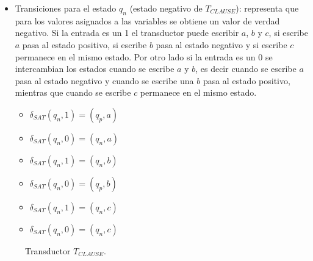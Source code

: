 \begin{itemize}
    \item Transiciones para el estado $q_n$ (estado negativo de $T_{CLAUSE}$): representa que para los valores
          asignados a las variables se obtiene un valor de verdad negativo. Si la entrada es un 1 el 
          transductor puede escribir $a$, $b$ y $c$, si escribe $a$ pasa al estado positivo, si escribe $b$
          pasa al estado negativo y si escribe $c$ permanece en el mismo estado. Por otro lado si la entrada 
          es un 0 se intercambian los estados cuando se escribe $a$ y $b$, es decir cuando se escribe $a$
          pasa al estado negativo y cuando se escribe una $b$ pasa al estado positivo, mientras que cuando 
          se escribe $c$ permanece en el mismo estado.
          \begin{multicols}{2}
              \begin{itemize}
                  \item $\delta_{SAT}(q_{n},1)=(q_{p},a)$
                  \item $\delta_{SAT}(q_{n},0)=(q_{n},a)$
                  \item $\delta_{SAT}(q_{n},1)=(q_{n},b)$
                  \item $\delta_{SAT}(q_{n},0)=(q_{p},b)$
                  \item $\delta_{SAT}(q_{n},1)=(q_{n},c)$
                  \item $\delta_{SAT}(q_{n},0)=(q_{n},c)$
              \end{itemize}
          \end{multicols}
\end{itemize}

\begin{figure}[h]
    \centering  \begin{otherlanguage}{english}
    \end{otherlanguage}
    \caption{Transductor $T_{CLAUSE}$.}
    \label{fig:transducer_clause} %
\end{figure}

